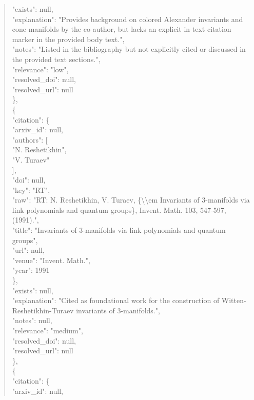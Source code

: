 \documentclass[11pt]{article}
\begin{document}
\begin{quote}
      "exists": null,\\
      "explanation": "Provides background on colored Alexander invariants and cone-manifolds by the co-author, but lacks an explicit in-text citation marker in the provided body text.",\\
      "notes": "Listed in the bibliography but not explicitly cited or discussed in the provided text sections.",\\
      "relevance": "low",\\
      "resolved\_doi": null,\\
      "resolved\_url": null\\
    \},\\
    \{\\
      "citation": \{\\
        "arxiv\_id": null,\\
        "authors": [\\
          "N. Reshetikhin",\\
          "V. Turaev"\\
        ],\\
        "doi": null,\\
        "key": "RT",\\
        "raw": "RT: N. Reshetikhin, V. Turaev, \{\textbackslash{}\textbackslash{}em Invariants of 3-manifolds via link polynomials and quantum groups\}, Invent. Math. 103, 547-597, (1991).",\\
        "title": "Invariants of 3-manifolds via link polynomials and quantum groups",\\
        "url": null,\\
        "venue": "Invent. Math.",\\
        "year": 1991\\
      \},\\
      "exists": null,\\
      "explanation": "Cited as foundational work for the construction of Witten-Reshetikhin-Turaev invariants of 3-manifolds.",\\
      "notes": null,\\
      "relevance": "medium",\\
      "resolved\_doi": null,\\
      "resolved\_url": null\\
    \},\\
    \{\\
      "citation": \{\\
        "arxiv\_id": null,\\

\end{quote}
\end{document}
